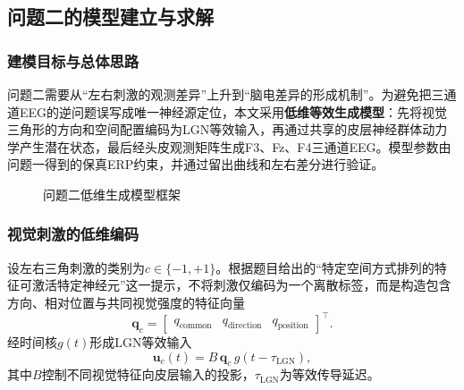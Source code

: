 \subsection{问题二的模型建立与求解}

\subsubsection{建模目标与总体思路}

问题二需要从“左右刺激的观测差异”上升到“脑电差异的形成机制”。为避免把三通道EEG的逆问题误写成唯一神经源定位，本文采用\textbf{低维等效生成模型}：先将视觉三角形的方向和空间配置编码为LGN等效输入，再通过共享的皮层神经群体动力学产生潜在状态，最后经头皮观测矩阵生成F3、Fz、F4三通道EEG。模型参数由问题一得到的保真ERP约束，并通过留出曲线和左右差分进行验证。

\begin{figure}[H]
\centering
{}
\caption{问题二低维生成模型框架}
\label{fig:q2_framework}
\end{figure}

\subsubsection{视觉刺激的低维编码}

设左右三角刺激的类别为$c\in\{-1,+1\}$。根据题目给出的“特定空间方式排列的特征可激活特定神经元”这一提示，不将刺激仅编码为一个离散标签，而是构造包含方向、相对位置与共同视觉强度的特征向量
\begin{equation}
\bm q_c=
\begin{bmatrix}
q_{\mathrm{common}} &
q_{\mathrm{direction}} &
q_{\mathrm{position}}
\end{bmatrix}^{\top}.
\end{equation}
经时间核$g(t)$形成LGN等效输入
\begin{equation}
\bm u_c(t)=B\,\bm q_c\,g(t-\tau_{\mathrm{LGN}}),
\label{eq:q2_lgn_input}
\end{equation}
其中$B$控制不同视觉特征向皮层输入的投影，$\tau_{\mathrm{LGN}}$为等效传导延迟。

